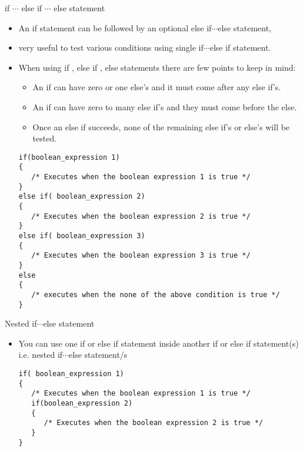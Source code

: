 \documentclass[10pt,t]{beamer}
\begin{document}
\begin{frame}[fragile]{if $\cdots$ else if $\cdots$ else statement}
  \begin{itemize}
    \item An if statement can be followed by an optional else if$\cdots$else statement,
    \item very useful to test various conditions using single if$\cdots$else if statement.
    \item When using if , else if , else statements there are few points to keep in mind:
    \begin{itemize}
      \item An if can have zero or one else's and it must come after any else if's.
      \item An if can have zero to many else if's and they must come before the else.
      \item Once an else if succeeds, none of the remaining else if's or else's will be tested.
    \end{itemize}
      \begin{block}{}
        \begin{lstlisting}[basicstyle=\scriptsize\ttfamily]
if(boolean_expression 1)
{
   /* Executes when the boolean expression 1 is true */
}
else if( boolean_expression 2)
{
   /* Executes when the boolean expression 2 is true */
}
else if( boolean_expression 3)
{
   /* Executes when the boolean expression 3 is true */
}
else 
{
   /* executes when the none of the above condition is true */
}
        \end{lstlisting}
      \end{block}
  \end{itemize}
\end{frame}

\begin{frame}[fragile]{}
  
\end{frame}

\begin{frame}[fragile]{Nested if$\cdots$else statement}
  \begin{itemize}
    \item You can use one if or else if statement inside another if or else if statement(s) i.e. nested if$\cdots$else statement/s
      \begin{block}{}
        \begin{lstlisting}
if( boolean_expression 1)
{
   /* Executes when the boolean expression 1 is true */
   if(boolean_expression 2)
   {
      /* Executes when the boolean expression 2 is true */
   }
}
        \end{lstlisting}
      \end{block}
  \end{itemize}
\end{frame}
\end{document}
